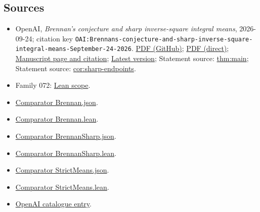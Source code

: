 \documentclass[11pt]{article}
\begin{document}
\subsection{Sources}
\begin{itemize}
\item OpenAI, \emph{Brennan's conjecture and sharp inverse-square integral means}, 2026-09-24; citation key \texttt{OAI:Brennans-conjecture-and-sharp-inverse-square-integral-means-September-24-2026}. \href{https://github.com/openai/math/blob/adc7f1241b42e322a6451854ab7e4b4c146bf78a/preprints/Brennans-conjecture-and-sharp-inverse-square-integral-means-September-24-2026/paper.pdf}{PDF (GitHub)}; \href{https://github.com/openai/math/raw/adc7f1241b42e322a6451854ab7e4b4c146bf78a/preprints/Brennans-conjecture-and-sharp-inverse-square-integral-means-September-24-2026/paper.pdf}{PDF (direct)}; \href{https://github.com/openai/math/blob/adc7f1241b42e322a6451854ab7e4b4c146bf78a/preprints/Brennans-conjecture-and-sharp-inverse-square-integral-means-September-24-2026/README.md}{Manuscript page and citation}; \href{https://github.com/openai/math/blob/main/preprints/Brennans-conjecture-and-sharp-inverse-square-integral-means-September-24-2026/paper.pdf}{Latest version}; Statement source: \href{https://github.com/openai/math/blob/adc7f1241b42e322a6451854ab7e4b4c146bf78a/preprints/Brennans-conjecture-and-sharp-inverse-square-integral-means-September-24-2026/build/sections/00-introduction.tex\#L52}{thm:main}; Statement source: \href{https://github.com/openai/math/blob/adc7f1241b42e322a6451854ab7e4b4c146bf78a/preprints/Brennans-conjecture-and-sharp-inverse-square-integral-means-September-24-2026/build/sections/00-introduction.tex\#L82}{cor:sharp-endpoints}.
\item Family 072: \href{https://github.com/openai/math/blob/adc7f1241b42e322a6451854ab7e4b4c146bf78a/lean/docs/072.md}{Lean scope}.
\item \href{https://github.com/openai/math/blob/adc7f1241b42e322a6451854ab7e4b4c146bf78a/lean/ComparatorChallenges/Brennan.json}{Comparator Brennan.json}.
\item \href{https://github.com/openai/math/blob/adc7f1241b42e322a6451854ab7e4b4c146bf78a/lean/ComparatorChallenges/Brennan.lean}{Comparator Brennan.lean}.
\item \href{https://github.com/openai/math/blob/adc7f1241b42e322a6451854ab7e4b4c146bf78a/lean/ComparatorChallenges/BrennanSharp.json}{Comparator BrennanSharp.json}.
\item \href{https://github.com/openai/math/blob/adc7f1241b42e322a6451854ab7e4b4c146bf78a/lean/ComparatorChallenges/BrennanSharp.lean}{Comparator BrennanSharp.lean}.
\item \href{https://github.com/openai/math/blob/adc7f1241b42e322a6451854ab7e4b4c146bf78a/lean/ComparatorChallenges/StrictMeans.json}{Comparator StrictMeans.json}.
\item \href{https://github.com/openai/math/blob/adc7f1241b42e322a6451854ab7e4b4c146bf78a/lean/ComparatorChallenges/StrictMeans.lean}{Comparator StrictMeans.lean}.
\item \href{https://github.com/openai/math/blob/adc7f1241b42e322a6451854ab7e4b4c146bf78a/CONTENTS.md}{OpenAI catalogue entry}.
\end{itemize}
\end{document}
